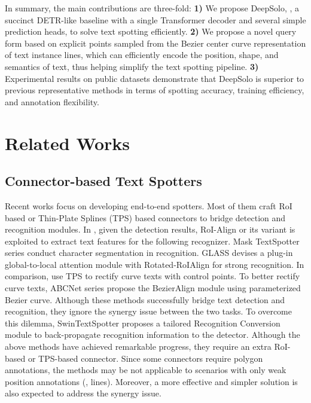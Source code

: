 \documentclass[10pt,twocolumn,letterpaper]{article}
\begin{document}
In summary, the main contributions are three-fold: \textbf{1)} We propose DeepSolo, \ie, a succinct DETR-like baseline with a single Transformer decoder and several simple prediction heads, to solve text spotting efficiently. \textbf{2)} We propose a novel query form based on explicit points sampled from the Bezier center curve representation of text instance lines, which can efficiently encode the position, shape, and semantics of text, thus helping simplify the text spotting pipeline. \textbf{3)} Experimental results on public datasets demonstrate that DeepSolo is superior to previous representative methods in terms of spotting accuracy, training efficiency, and annotation flexibility.

\section{Related Works}
\subsection{Connector-based Text Spotters}
Recent works focus on developing end-to-end spotters. Most of them craft RoI \cite{he2017mask} based or Thin-Plate Splines (TPS) \cite{bookstein1989principal} based connectors to bridge detection and recognition modules. In \cite{he2018end, liu2018fots,feng2019textdragon}, given the detection results, RoI-Align or its variant is exploited to extract text features for the following recognizer. Mask TextSpotter series \cite{lyu2018mask, liao2020mask, liao2021mask} conduct character segmentation in recognition. GLASS \cite{ronen2022glass} devises a plug-in global-to-local attention module with Rotated-RoIAlign for strong recognition. In comparison, \cite{qiao2020text,wang2020all} use TPS to rectify curve texts with control points. To better rectify curve texts, ABCNet series \cite{liu2020abcnet,liu2021abcnet} propose the BezierAlign module using parameterized Bezier curve. Although these methods successfully bridge text detection and recognition, they ignore the synergy issue \cite{zhong2021arts, huang2022swintextspotter} between the two tasks. To overcome this dilemma, SwinTextSpotter \cite{huang2022swintextspotter} proposes a tailored Recognition Conversion module to back-propagate recognition information to the detector. Although the above methods have achieved remarkable progress, they require an extra RoI-based or TPS-based connector. Since some connectors require polygon annotations, the methods may be not applicable to scenarios with only weak position annotations (\eg, lines). Moreover, a more effective and simpler solution is also expected to address the synergy issue.
\end{document}
